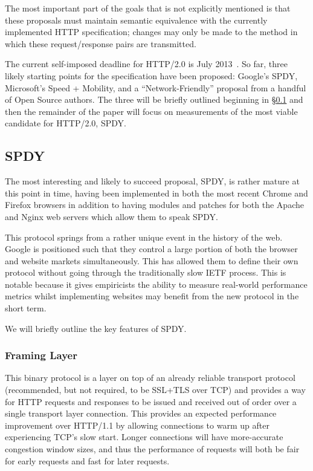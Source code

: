 \documentclass[11pt,letterpaper,notitlepage]{article}
\begin{document}
The most important part of the goals that is not explicitly mentioned is that
these proposals must maintain semantic equivalence with the currently
implemented HTTP specification; changes may only be made to the method in
which these request/response pairs are transmitted.

The current self-imposed deadline for HTTP/2.0 is July
2013~\cite{httpbis-charter}.  So far, three likely starting points for
the specification have been proposed: Google's SPDY, Microsoft's Speed +
Mobility, and a ``Network-Friendly'' proposal from a handful of Open Source
authors. The three will be briefly outlined beginning in
\S\ref{sec:background/spdy} and then the remainder of the paper will focus on
measurements of the most viable candidate for HTTP/2.0, SPDY.

\subsection{SPDY}
\label{sec:background/spdy}
The most interesting and likely to succeed proposal, SPDY, is rather mature
at this point in time, having been implemented in both the most recent Chrome
and Firefox browsers in addition to having modules and patches for both the
Apache and Nginx web servers which allow them to speak SPDY.

This protocol springs from a rather unique event in the history of the web.
Google is positioned such that they control a large portion of both the browser
and website markets simultaneously. This has allowed them to define their own
protocol without going through the traditionally slow IETF process. This is
notable because it gives empiricists the ability to measure real-world
performance metrics whilst implementing websites may benefit from the new
protocol in the short term.

We will briefly outline the key features of SPDY.

\subsubsection{Framing Layer}
This binary protocol is a layer on top of an already reliable transport
protocol (recommended, but not required, to be SSL+TLS over TCP) and provides a
way for HTTP requests and responses to be issued and received out of order over
a single transport layer connection.  This provides an expected performance
improvement over HTTP/1.1 by allowing connections to warm up after experiencing
TCP's slow start. Longer connections will have more-accurate congestion window
sizes, and thus the performance of requests will both be fair for early
requests and fast for later requests.
\end{document}
